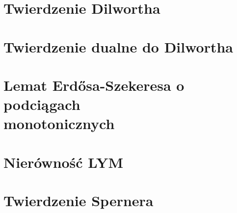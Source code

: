\section{Twierdzenie Dilwortha}


\section{Twierdzenie dualne do Dilwortha}


\section[Lemat Erdősa-Szekeresa o podciągach monotonicznych]{Lemat Erdősa-Szekeresa o podciągach\\monotonicznych}


\section{Nierówność LYM}


\section{Twierdzenie Spernera}
